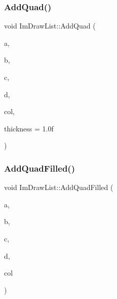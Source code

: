 \subsubsection{\texorpdfstring{Add\+Quad()}{AddQuad()}}
{\footnotesize\ttfamily void Im\+Draw\+List\+::\+Add\+Quad (\begin{DoxyParamCaption}\item[{const \mbox{\hyperlink{struct_im_vec2}{Im\+Vec2}} \&}]{a,  }\item[{const \mbox{\hyperlink{struct_im_vec2}{Im\+Vec2}} \&}]{b,  }\item[{const \mbox{\hyperlink{struct_im_vec2}{Im\+Vec2}} \&}]{c,  }\item[{const \mbox{\hyperlink{struct_im_vec2}{Im\+Vec2}} \&}]{d,  }\item[{\mbox{\hyperlink{imgui_8h_a118cff4eeb8d00e7d07ce3d6460eed36}{Im\+U32}}}]{col,  }\item[{float}]{thickness = {\ttfamily 1.0f} }\end{DoxyParamCaption})}

\mbox{\label{struct_im_draw_list_abefdc71c2dc6b6331193aee3ff680ed0}} 
\subsubsection{\texorpdfstring{Add\+Quad\+Filled()}{AddQuadFilled()}}
{\footnotesize\ttfamily void Im\+Draw\+List\+::\+Add\+Quad\+Filled (\begin{DoxyParamCaption}\item[{const \mbox{\hyperlink{struct_im_vec2}{Im\+Vec2}} \&}]{a,  }\item[{const \mbox{\hyperlink{struct_im_vec2}{Im\+Vec2}} \&}]{b,  }\item[{const \mbox{\hyperlink{struct_im_vec2}{Im\+Vec2}} \&}]{c,  }\item[{const \mbox{\hyperlink{struct_im_vec2}{Im\+Vec2}} \&}]{d,  }\item[{\mbox{\hyperlink{imgui_8h_a118cff4eeb8d00e7d07ce3d6460eed36}{Im\+U32}}}]{col }\end{DoxyParamCaption})}

\mbox{\label{struct_im_draw_list_ac4a9baaadd92d203f61c395f6158c7e6}} 
